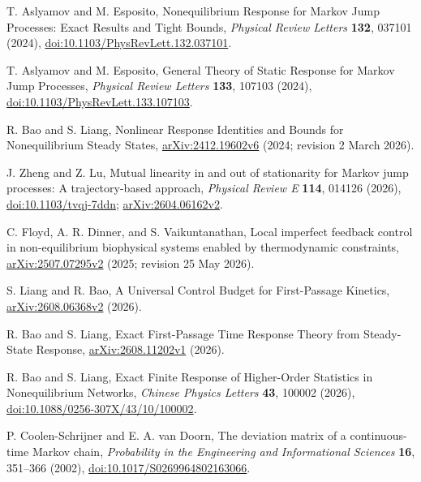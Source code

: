 T. Aslyamov and M. Esposito,
Nonequilibrium Response for Markov Jump Processes: Exact Results and Tight Bounds,
\emph{Physical Review Letters} \textbf{132}, 037101 (2024),
\href{https://doi.org/10.1103/PhysRevLett.132.037101}{doi:10.1103/PhysRevLett.132.037101}.

T. Aslyamov and M. Esposito,
General Theory of Static Response for Markov Jump Processes,
\emph{Physical Review Letters} \textbf{133}, 107103 (2024),
\href{https://doi.org/10.1103/PhysRevLett.133.107103}{doi:10.1103/PhysRevLett.133.107103}.

R. Bao and S. Liang,
Nonlinear Response Identities and Bounds for Nonequilibrium Steady States,
\href{https://arxiv.org/abs/2412.19602v6}{arXiv:2412.19602v6}
(2024; revision 2 March 2026).

J. Zheng and Z. Lu,
Mutual linearity in and out of stationarity for Markov jump processes:
A trajectory-based approach,
\emph{Physical Review E} \textbf{114}, 014126 (2026),
\href{https://doi.org/10.1103/tvqj-7ddn}{doi:10.1103/tvqj-7ddn};
\href{https://arxiv.org/abs/2604.06162v2}{arXiv:2604.06162v2}.

C. Floyd, A. R. Dinner, and S. Vaikuntanathan,
Local imperfect feedback control in non-equilibrium biophysical systems
enabled by thermodynamic constraints,
\href{https://arxiv.org/abs/2507.07295v2}{arXiv:2507.07295v2}
(2025; revision 25 May 2026).

S. Liang and R. Bao,
A Universal Control Budget for First-Passage Kinetics,
\href{https://arxiv.org/abs/2608.06368v2}{arXiv:2608.06368v2} (2026).

R. Bao and S. Liang,
Exact First-Passage Time Response Theory from Steady-State Response,
\href{https://arxiv.org/abs/2608.11202v1}{arXiv:2608.11202v1} (2026).

R. Bao and S. Liang,
Exact Finite Response of Higher-Order Statistics in Nonequilibrium Networks,
\emph{Chinese Physics Letters} \textbf{43}, 100002 (2026),
\href{https://doi.org/10.1088/0256-307X/43/10/100002}{doi:10.1088/0256-307X/43/10/100002}.

P. Coolen-Schrijner and E. A. van Doorn,
The deviation matrix of a continuous-time Markov chain,
\emph{Probability in the Engineering and Informational Sciences}
\textbf{16}, 351--366 (2002),
\href{https://doi.org/10.1017/S0269964802163066}{doi:10.1017/S0269964802163066}.

